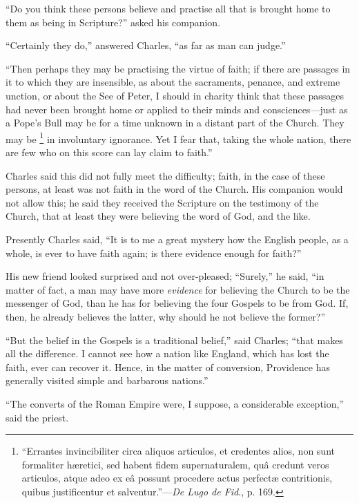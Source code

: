 ``Do you think these persons believe and practise all that is
brought home to them as being in Scripture?'' asked his companion.

``Certainly they do,'' answered Charles, ``as far as
man can judge.''

``Then perhaps they may be practising the virtue of faith; if
there are passages in it to which they are insensible, as about the
sacraments, penance, and extreme unction, or about the See of Peter, I
should in charity think that these passages had never been brought
home or applied to their minds and consciences—just as a Pope's Bull
may be for a time unknown in a distant part of the Church. They may be
\footnote{``Errantes invincibiliter circa aliquos articulos, et credentes
alios, non sunt formaliter hæretici, sed habent fidem supernaturalem,
quâ credunt veros articulos, atque adeo ex eâ possunt procedere
actus perfectæ contritionis, quibus justificentur et salventur.''—\emph{De
Lugo de Fid}., p. 169.} in involuntary ignorance.
Yet I fear that, taking the whole nation, there are few who on this
score can lay claim to faith.''

Charles said this did not fully meet the difficulty; faith, in the
case of these persons, at least was not faith in the word of the
Church. His companion would not allow this; he said they received the
Scripture on the testimony of the Church, that at least they were
believing the word of God, and the like.

Presently Charles said, ``It is to me a great mystery how the
English people, as a whole, is ever to have faith again; is there
evidence enough for faith?''

His new friend looked surprised and not over-pleased;
``Surely,'' he said, ``in matter of fact, a man may have
more \emph{evidence} for believing the Church to be the messenger of
God, than he has for believing the four Gospels to be from God. If,
then, he already believes the latter, why should he not believe the
former?''

``But the belief in the Gospels is a traditional belief,''
said Charles; ``that makes all the difference. I cannot see how a
nation like England, which has lost the faith, ever can recover it.
Hence, in the matter of conversion, Providence has generally visited
simple and barbarous nations.''

``The converts of the Roman Empire were, I suppose, a
considerable exception,'' said the priest.

